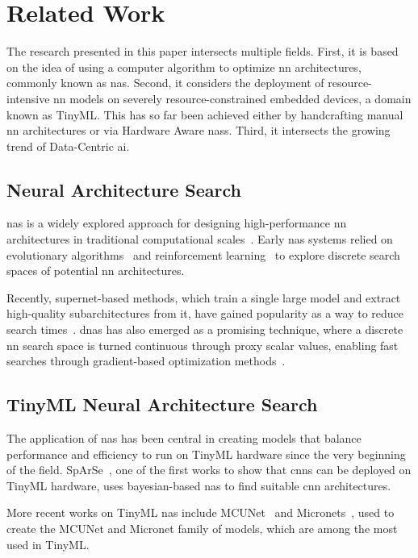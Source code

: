 \section{Related Work}
\label{sec:related_work}
The research presented in this paper intersects multiple fields.
First, it is based on the idea of using a computer algorithm to optimize \gls{nn} architectures, commonly known as \gls{nas}.
Second, it considers the deployment of resource-intensive \gls{nn} models on severely resource-constrained embedded devices, a domain known as TinyML.
This has so far been achieved either by handcrafting manual \gls{nn} architectures or via Hardware Aware \glspl{nas}.
Third, it intersects the growing trend of Data-Centric \gls{ai}.

\subsection{Neural Architecture Search}
\Gls{nas} is a widely explored approach for designing high-performance \gls{nn} architectures in traditional computational scales~\cite{zoph2017neural, zoph2018learning, ying2019bench, brock2018smash}.
Early \gls{nas} systems relied on evolutionary algorithms~\cite{real2017large} and reinforcement learning~\cite{zoph2017neural, zoph2018learning} to explore discrete search spaces of potential \gls{nn} architectures.

Recently, supernet-based methods, which train a single large model and extract high-quality subarchitectures from it, have gained popularity as a way to reduce search times~\cite{brock2018smash}.
\Gls{dnas} has also emerged as a promising technique, where a discrete \gls{nn} search space is turned continuous through proxy scalar values, enabling fast searches through gradient-based optimization methods~\cite{liu2018darts}.

\subsection{TinyML Neural Architecture Search}
The application of \gls{nas} has been central in creating models that balance performance and efficiency to run on TinyML hardware since the very beginning of the field.
SpArSe~\cite{fedorov2019sparse}, one of the first works to show that \glspl{cnn} can be deployed on TinyML hardware, uses bayesian-based \gls{nas} to find suitable \gls{cnn} architectures.

More recent works on TinyML \gls{nas} include MCUNet~\cite{lin2020mcunet} and Micronets~\cite{banbury2021micronets}, used to create the MCUNet and Micronet family of models, which are among the most used in TinyML.

